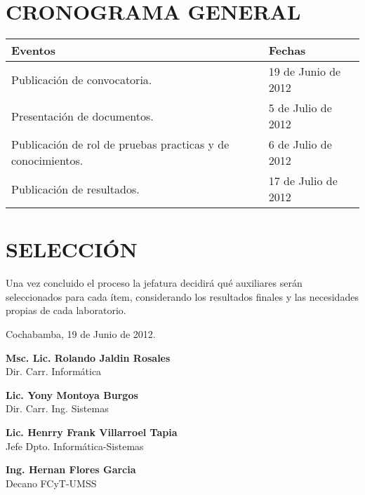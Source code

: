 \documentclass[letterpaper,11pt]{article}
\begin{document}
\section{CRONOGRAMA GENERAL}
\begin{tabular}{|l|l|}
\hline
 \textbf{Eventos} & \textbf{Fechas} \\
\hline
 Publicación de convocatoria. & 19 de Junio de 2012 \\
\hline
 Presentación de documentos. & 5 de Julio de 2012 \\
\hline
 Publicación de rol de pruebas practicas y de conocimientos. & 6 de Julio de 2012 \\
\hline
 Publicación de resultados. & 17 de Julio de 2012 \\
\hline
\end{tabular}

\section{SELECCIÓN}
Una vez concluido el proceso la jefatura decidirá qué auxiliares serán seleccionados para cada ítem, considerando los resultados finales y las necesidades propias de cada laboratorio.

\vspace{4cm}

\begin{center}
Cochabamba, 19 de Junio de 2012.
\end{center}

\vspace{4cm}

\begin{minipage}[b]{0.5\textwidth}
\begin{center}
{\bf Msc. Lic. Rolando Jaldin Rosales}\\
Dir. Carr. Informática\\
\end{center}
\end{minipage}
\begin{minipage}[b]{0.5\textwidth}
\begin{center}
{\bf Lic. Yony Montoya Burgos}\\
Dir. Carr. Ing. Sistemas\\
\end{center}
\end{minipage}

\vspace{4cm}

\begin{minipage}[b]{0.5\textwidth}
\begin{center}
{\bf Lic. Henrry Frank Villarroel Tapia}\\
Jefe Dpto. Informática-Sistemas\\
\end{center}
\end{minipage}
\begin{minipage}[b]{0.5\textwidth}
\begin{center}
{\bf Ing. Hernan Flores Garcia}\\
Decano FCyT-UMSS\\
\end{center}
\end{minipage}
\end{document}
